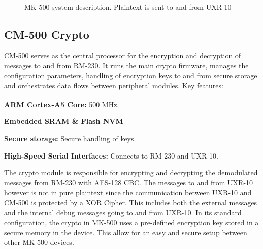 \documentclass[11pt,a4paper,twocolumn]{article}
\begin{document}
\begin{figure}[t]
\centering
{}
\caption{MK-500 system description. Plaintext is sent to and from UXR-10}
\label{fig:block_diagram}
\end{figure}

\subsection{CM-500 Crypto} CM-500 serves as the central processor for the encryption and decryption of messages to and from RM-230. It runs the main crypto firmware, manages the configuration parameters, handling of encryption keys to and from secure storage and orchestrates data flows between peripheral modules. Key features:
\begin{compactitem}
\item 
\textbf{ARM\textsuperscript{\textregistered} Cortex\textsuperscript{\textregistered}-A5 Core:} 500 MHz.
\item
\textbf{Embedded SRAM
\& Flash NVM}
\item
\textbf{Secure storage:} Secure handling of keys.
\item
\textbf{High-Speed Serial Interfaces:} Connects to RM-230 and UXR-10.
\end{compactitem} 
The crypto module is responsible for encrypting and decrypting the demodulated messages from RM-230 with AES-128 CBC. The messages to and from UXR-10 however is not in pure plaintext since the communication between UXR-10 and CM-500 is protected by a XOR Cipher. This includes both the external messages and the internal debug messages going to and from UXR-10. In its standard configuration, the crypto in MK-500 uses a pre-defined encryption key stored in a secure memory in the device. This allow for an easy and secure setup between other MK-500 devices. 
\end{document}

